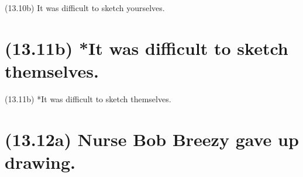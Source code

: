 \documentclass{article}
\begin{document}
\bigbreak
\begin{enumerate*}
\item[(13.10b)] It was difficult to sketch yourselves.
\end{enumerate*}
\bigbreak

\bigbreak
\begin{minipage}{\textwidth}
\end{minipage}
\bigbreak

\clearpage

%
%

\section*{(13.11b) *It was difficult to sketch themselves.}

\bigbreak
\begin{enumerate*}
\item[(13.11b)] *It was difficult to sketch themselves.
\end{enumerate*}
\bigbreak

\bigbreak
\begin{minipage}{\textwidth}
\end{minipage}
\bigbreak

\clearpage

%
%

\section*{(13.12a) Nurse Bob Breezy gave up drawing.}
\end{document}
